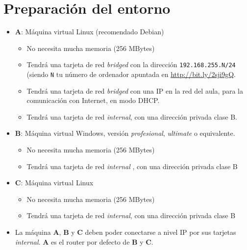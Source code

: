 \section{Preparación del entorno}
\begin{itemize}
\item  \textbf{A}: Máquina virtual Linux (recomendado Debian)
  \begin{itemize}
  \item No necesita mucha memoria (256 MBytes)
    
  \item Tendrá una tarjeta de red \textit{bridged} con la dirección \texttt{192.168.255.N/24} (siendo \texttt{N} tu número de ordenador apuntada en  \url{http://bit.ly/2sji9gQ}.
  \item Tendrá una tarjeta de red \textit{bridged} con una IP en la red del aula, para la comunicación con Internet, en modo DHCP.
  \item Tendrá una tarjeta de red \textit{internal}, con una dirección privada clase B.

  \end{itemize}



\item \textbf{B}: Máquina virtual Windows, versión \textit{profesional}, \textit{ultimate} o equivalente.
  \begin{itemize}
  \item  No necesita mucha memoria (256 MBytes)
  \item Tendrá una tarjeta de red \textit{internal} , con una dirección privada clase B
  \end{itemize}
\item \textbf{C}: Máquina virtual Linux
  \begin{itemize}
  \item No necesita mucha memoria (256 MBytes)
  \item Tendrá una tarjeta de red \textit{internal}, con una dirección privada clase B
  \end{itemize}
  
\item  La máquina \textbf{A}, \textbf{B} y \textbf{C} deben poder conectarse a nivel IP por sus tarjetas \textit{internal}. \textbf{A} es el router por defecto de \textbf{B} y \textbf{C}.
\end{itemize}



